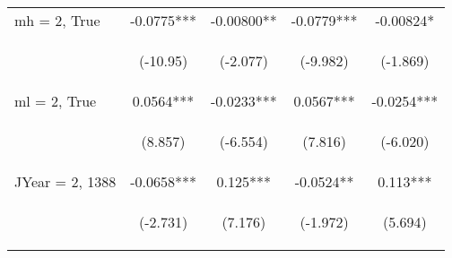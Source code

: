 \documentclass[]{article}
\begin{document}
\begin{center}
\begin{tabular}{lcccc}
        mh = 2, True     & -0.0775***                                      & -0.00800**                                     & -0.0779***                                     & -0.00824*                                      \\
        \vspace{4pt}     & \begin{footnotesize}(-10.95)\end{footnotesize}  & \begin{footnotesize}(-2.077)\end{footnotesize} & \begin{footnotesize}(-9.982)\end{footnotesize} & \begin{footnotesize}(-1.869)\end{footnotesize} \\
        ml = 2, True     & 0.0564***                                       & -0.0233***                                     & 0.0567***                                      & -0.0254***                                     \\
        \vspace{4pt}     & \begin{footnotesize}(8.857)\end{footnotesize}   & \begin{footnotesize}(-6.554)\end{footnotesize} & \begin{footnotesize}(7.816)\end{footnotesize}  & \begin{footnotesize}(-6.020)\end{footnotesize} \\
        JYear = 2, 1388  & -0.0658***                                      & 0.125***                                       & -0.0524**                                      & 0.113***                                       \\
        \vspace{4pt}     & \begin{footnotesize}(-2.731)\end{footnotesize}  & \begin{footnotesize}(7.176)\end{footnotesize}  & \begin{footnotesize}(-1.972)\end{footnotesize} & \begin{footnotesize}(5.694)\end{footnotesize}  \\

\end{tabular}
\end{center}
\end{document}
